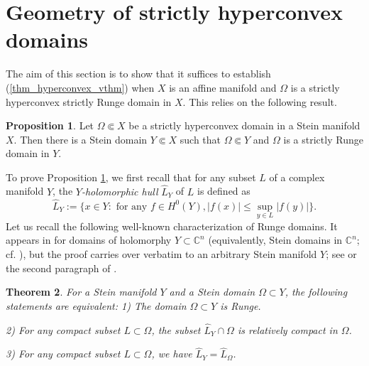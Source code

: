 \documentclass[12pt]{article}
\numberwithin{equation}{section}
\theoremstyle{theorem}
\newtheorem{thm}{Theorem}[section]
\theoremstyle{definition}
\newtheorem{prop}[thm]{Proposition}
\theoremstyle{remark}
\newcommand{\comp}{\mathbb{C}}
\begin{document}
	\section{Geometry of strictly hyperconvex domains}\label{sect_geom_hyp}
	The aim of this section is to show that it suffices to establish (\ref{thm_hyperconvex_vthm}) when $X$ is an affine manifold and $\Omega$ is a strictly hyperconvex strictly Runge domain in $X$. 
	This relies on the following result.
	\begin{prop}\label{prop_runge_red}
		Let $\Omega \Subset X$ be a strictly hyperconvex domain in a Stein manifold $X$.
		Then there is a Stein domain $Y \Subset X$ such that $\Omega \Subset Y$ and $\Omega$ is a strictly Runge domain in $Y$.
	\end{prop}
	To prove Proposition \ref{prop_runge_red}, we first recall that for any subset $L$ of a complex manifold $Y$, the \textit{$Y$-holomorphic hull} $\widehat{L}_Y$ of $L$ is defined as
	\begin{equation}\label{eq_hull}
		\widehat{L}_Y
		:=
		\Big\{
			x \in Y : \text{ for any } f \in H^0(Y), |f(x)| \leq \sup_{y \in L} |f(y)|
		\Big\}.
	\end{equation}
	Let us recall the following well-known characterization of Runge domains. 
	It appears in \cite[Theorem 4.3.3]{Hormander} for domains of holomorphy $Y \subset \comp^n$ (equivalently, Stein domains in $\comp^n$; cf. \cite[Theorem 4.2.8]{Hormander}), but the proof carries over verbatim to an arbitrary Stein manifold $Y$; see \cite[proof of Theorem 5.2.10]{Hormander} or the second paragraph of \cite{DemLempShiff}.
	\begin{thm}\label{thm_runge}
		For a Stein manifold $Y$ and a Stein domain $\Omega \subset Y$, the following statements are equivalent:
		1) The domain $\Omega \subset Y$ is Runge.
		\par  
		2) For any compact subset $L \subset \Omega$, the subset $\widehat{L}_Y \cap \Omega$ is relatively compact in $\Omega$.
		\par
		3) For any compact subset $L \subset \Omega$, we have $\widehat{L}_Y = \widehat{L}_{\Omega}$.
	\end{thm}
\end{document}
